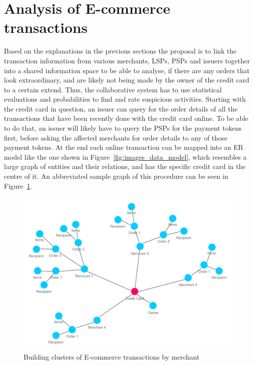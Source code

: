 
\section{Analysis of \gls{E-commerce} transactions}
\label{sec:analyse_transactions}

Based on the explanations in the previous sections the proposal is to link the transaction information from various merchants, \gls{LSP}s, \gls{PSP}s and issuers together into a shared information space to be able to analyse, if there are any orders that look extraordinary, and are likely not being made by the owner of the credit card to a certain extend. Thus, the collaborative system has to use statistical evaluations and probabilities to find and rate suspicious activities. Starting with the credit card in question, an issuer can query for the order details of all the transactions that have been recently done with the credit card online. To be able to do that, an issuer will likely have to query the \gls{PSP}s for the payment tokens first, before asking the affected merchants for order details to any of those payment tokens. At the end each online transaction can be mapped into an \gls{ER} model like the one shown in Figure~\ref{fig:images_data_model}, which resembles a large graph of entities and their relations, and has the specific credit card in the centre of it. An abbreviated sample graph of this procedure can be seen in Figure~\ref{fig:images_credit_card_graph}. \@

\begin{figure}[H]
  \centering
  \includegraphics[width=0.9\columnwidth]{images/ontology_scenario_2.pdf}
  \caption{Building clusters of \gls{E-commerce} transactions by merchant}
\label{fig:images_credit_card_graph}
\end{figure}


